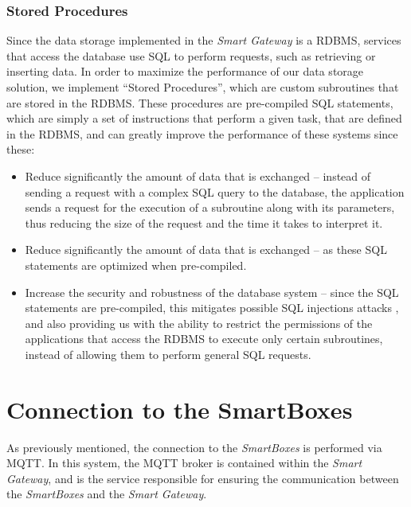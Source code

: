\subsubsection{Stored Procedures}

Since the data storage implemented in the \textit{Smart Gateway} is a \acs{RDBMS}, services that access the database use \acf{SQL} to perform requests, such as retrieving or inserting data. In order to maximize the performance of our data storage solution, we implement ``Stored Procedures'', which are custom subroutines that are stored in the \acs{RDBMS}. These procedures are pre-compiled \acs{SQL} statements, which are simply a set of instructions that perform a given task, that are defined in the \acs{RDBMS}, and can greatly improve the performance of these systems since these:

\begin{itemize}
    \item Reduce significantly the amount of data that is exchanged -- instead of sending a request with a complex \acs{SQL} query to the database, the application sends a request for the execution of a subroutine along with its parameters, thus reducing the size of the request and the time it takes to interpret it.
    \item Reduce significantly the amount of data that is exchanged -- as these \acs{SQL} statements are optimized when pre-compiled.
    \item Increase the security and robustness of the database system -- since the \acs{SQL} statements are pre-compiled, this mitigates possible \acs{SQL} injections attacks \cite{clarke2012sql}, and also providing us with the ability to restrict the permissions of the applications that access the \acs{RDBMS} to execute only certain subroutines, instead of allowing them to perform general \acs{SQL} requests.
\end{itemize}


\section{Connection to the SmartBoxes}


As previously mentioned, the connection to the \textit{SmartBoxes} is performed via \acs{MQTT}. In this system, the \acs{MQTT} broker is contained within the \textit{Smart Gateway}, and is the service responsible for ensuring the communication between the \textit{SmartBoxes} and the \textit{Smart Gateway}.

